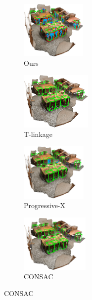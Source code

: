 \begin{figure}[ht]
    
          \begin{subfigure}{0.18\textwidth}
            \centering
            \includegraphics[height=2.8cm]{images/scan2cad-cad-ours1.png}
              \caption{Ours}
              \label{fig:scan2cad_cad-result1}
          \end{subfigure}
          \begin{subfigure}{0.18\textwidth}
            \centering
            \includegraphics[height=2.8cm]{images/scan2cad-cad-tlinkage1.png}
              \caption{T-linkage\cite{magri2014t}}
              \label{fig:scan2cad_cad-tlinkage1}
          \end{subfigure}
          \begin{subfigure}{0.2\textwidth}
            \centering
            \includegraphics[height=2.8cm]{images/scan2cad-cad-progx1.png}
              \caption{Progressive-X\cite{zhao2021progressive}}
              \label{fig:scan2cad_cad-prox1}
          \end{subfigure}
          \begin{subfigure}{0.18\textwidth}
            \centering
            \includegraphics[height=2.8cm]{images/scan2cad-cad-consac1.png}
              \caption{CONSAC\cite{kluger2020consac}}
              \label{fig:scan2cad_cad-consac1}
          \end{subfigure}

\end{figure}
